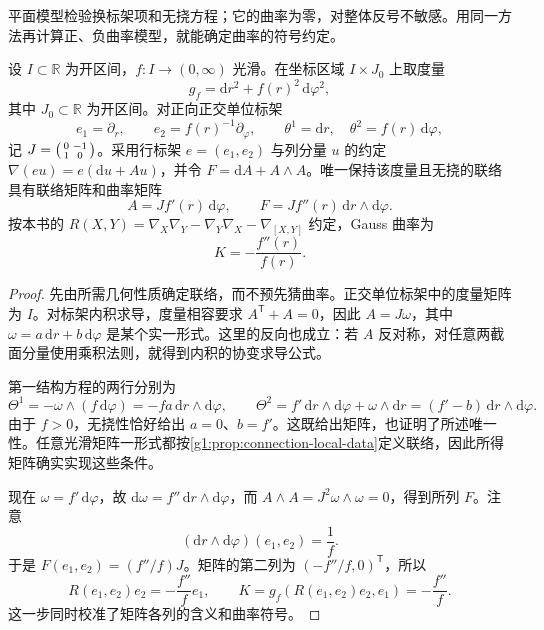 平面模型检验换标架项和无挠方程；它的曲率为零，对整体反号不敏感。用同一方法再计算正、负曲率模型，就能确定曲率的符号约定。

\begin{proposition}\label{g1:prop:connection-check-warped-metric}
	设 \(I\subset\mathbb R\) 为开区间，\(f:I\to(0,\infty)\) 光滑。在坐标区域 \(I\times J_0\) 上取度量
	\[
		g_f=\mathrm{d}r^2+f(r)^2\,\mathrm{d}\varphi^2,
	\]
	其中 \(J_0\subset\mathbb R\) 为开区间。对正向正交单位标架
	\[
		e_1=\partial_r,\qquad e_2=f(r)^{-1}\partial_\varphi,
		\qquad \theta^1=\mathrm{d}r,\quad \theta^2=f(r)\,\mathrm{d}\varphi,
	\]
	记 \(J=\begin{psmallmatrix}0&-1\\1&0\end{psmallmatrix}\)。采用行标架 \(e=(e_1,e_2)\) 与列分量 \(u\) 的约定 \(\nabla(eu)=e(\mathrm du+Au)\)，并令 \(F=\mathrm dA+A\wedge A\)。唯一保持该度量且无挠的联络具有联络矩阵和曲率矩阵
	\[
		A=J f'(r)\,\mathrm{d}\varphi,\qquad
		F=J f''(r)\,\mathrm{d}r\wedge\mathrm{d}\varphi.
	\]
	按本书的 \(R(X,Y)=\nabla_X\nabla_Y-\nabla_Y\nabla_X-\nabla_{[X,Y]}\) 约定，Gauss 曲率为
	\[
		K=-\frac{f''(r)}{f(r)}.
	\]
\end{proposition}
\begin{proof}
	先由所需几何性质确定联络，而不预先猜曲率。正交单位标架中的度量矩阵为 \(I\)。对标架内积求导，度量相容要求 \(A^{\mathsf T}+A=0\)，因此 \(A=J\omega\)，其中 \(\omega=a\,\mathrm{d}r+b\,\mathrm{d}\varphi\) 是某个实一形式。这里的反向也成立：若 \(A\) 反对称，对任意两截面分量使用乘积法则，就得到内积的协变求导公式。

	第一结构方程的两行分别为
	\[
		\Theta^1=-\omega\wedge(f\,\mathrm{d}\varphi)
		=-fa\,\mathrm{d}r\wedge\mathrm{d}\varphi,\qquad
		\Theta^2=f'\,\mathrm{d}r\wedge\mathrm{d}\varphi+\omega\wedge\mathrm{d}r
		=(f'-b)\,\mathrm{d}r\wedge\mathrm{d}\varphi.
	\]
	由于 \(f>0\)，无挠性恰好给出 \(a=0\)、\(b=f'\)。这既给出矩阵，也证明了所述唯一性。任意光滑矩阵一形式都按\cref{g1:prop:connection-local-data}定义联络，因此所得矩阵确实实现这些条件。

	现在 \(\omega=f'\,\mathrm{d}\varphi\)，故 \(\mathrm{d}\omega=f''\,\mathrm{d}r\wedge\mathrm{d}\varphi\)，而 \(A\wedge A=J^2\omega\wedge\omega=0\)，得到所列 \(F\)。注意
	\[
		(\mathrm{d}r\wedge\mathrm{d}\varphi)(e_1,e_2)=\frac1f.
	\]
	于是 \(F(e_1,e_2)=(f''/f)J\)。矩阵的第二列为 \((-f''/f,0)^{\mathsf T}\)，所以
	\[
		R(e_1,e_2)e_2=-\frac{f''}{f}e_1,\qquad
		K=g_f(R(e_1,e_2)e_2,e_1)=-\frac{f''}{f}.
	\]
	这一步同时校准了矩阵各列的含义和曲率符号。
\end{proof}

